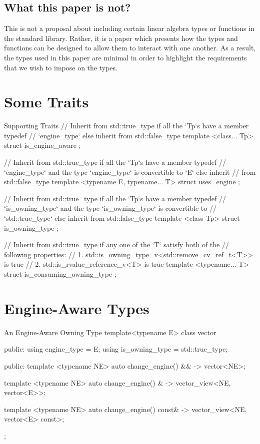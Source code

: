 \documentclass[oneside,11pt,a4paper]{jbarticle}
\begin{document}
\subsection{What this paper is not?}
This is not a proposal about including certain linear algebra types or functions
in the standard library. Rather, it is a paper which presents how the types and
functions can be designed to allow them to interact with one another. As a
result, the types used in this paper are minimal in order to highlight the
requirements that we wish to impose on the types.

\section{Some Traits}
\begin{codecpp}{Supporting Traits}
// Inherit from std::true_type if all the `Tp`s have a member typedef
// `engine_type` else inherit from std::false_type
template <class... Tp>
struct is_engine_aware {
};

// Inherit from std::true_type if all the `Tp`s have a member typedef
// `engine_type` and the type `engine_type` is convertible to `E` else inherit
// from std::false_type
template <typename E, typename... T>
struct uses_engine {
};


// Inherit from std::true_type if all the `Tp`s have a member typedef
// `is_owning_type` and the type `is_owning_type` is convertible to
// `std::true_type` else inherit from std::false_type
template <class Tp>
struct is_owning_type {
};

// Inherit from std::true_type if any one of the `T` satisfy both of the
// following properties:
// 1. std::is_owning_type_v<std::remove_cv_ref_t<T>> is true
// 2. std::is_rvalue_reference_v<T> is true
template <typename... T>
struct is_consuming_owning_type {
};
\end{codecpp}



\section{Engine-Aware Types}

\begin{codecpp}{An Engine-Aware Owning Type}
  template<typename E>
  class vector {
  public:
    using engine_type = E;
    using is_owning_type = std::true_type;

  public:
    template <typename NE>
    auto change_engine() && -> vector<NE>;

    template <typename NE>
    auto change_engine() & -> vector_view<NE, vector<E>>;

    template <typename NE>
    auto change_engine() const& -> vector_view<NE, vector<E> const>;
  };
\end{codecpp}
\end{document}
